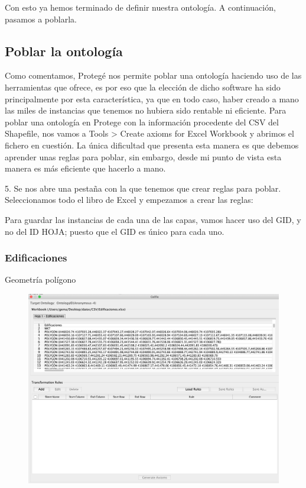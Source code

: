 Con esto ya hemos terminado de definir nuestra ontología. A continuación, pasamos a poblarla.

\subsection{Poblar la ontología}


Como comentamos, Protegé nos permite poblar una ontología haciendo uso de las herramientas que ofrece, es por eso que la elección de dicho software ha sido principalmente por esta característica, ya que en todo caso, haber creado a mano las miles de instancias que tenemos no hubiera sido rentable ni eficiente. Para poblar una ontología en Protege  con la información procedente del CSV del Shapefile,  nos vamos a Tools > Create axioms for Excel Workbook y abrimos el fichero en cuestión. La única dificultad que presenta esta manera es que debemos aprender unas reglas para poblar, sin embargo, desde mi punto de vista esta manera es más eficiente que hacerlo a mano.


5. Se nos abre una pestaña con la que tenemos que crear reglas para poblar. Seleccionamos todo el libro de Excel y empezamos a crear las reglas:


Para guardar las instancias de cada una de las capas, vamos hacer uso del GID, y no del ID HOJA; puesto que el GID es único para cada uno.


\subsubsection{Edificaciones}

Geometría polígono

\begin{figure}[H]
	\centering
	\includegraphics[width=0.7\linewidth]{imagenes/capitulo4/edificaciones1}
	\caption{}
	\label{fig:edificaciones1}
\end{figure}

